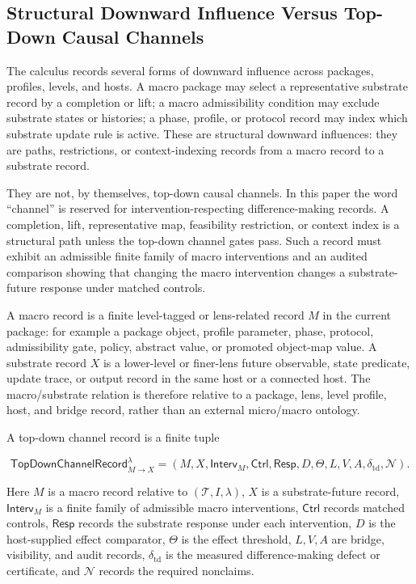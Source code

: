 \documentclass[11pt]{article}
\theoremstyle{definition}
\begin{document}
\subsection{Structural Downward Influence Versus Top-Down Causal Channels}

The calculus records several forms of downward influence across packages, profiles, levels, and hosts. A macro package may select a representative substrate record by a completion or lift; a macro admissibility condition may exclude substrate states or histories; a phase, profile, or protocol record may index which substrate update rule is active. These are structural downward influences: they are paths, restrictions, or context-indexing records from a macro record to a substrate record.

They are not, by themselves, top-down causal channels. In this paper the word ``channel'' is reserved for intervention-respecting difference-making records. A completion, lift, representative map, feasibility restriction, or context index is a structural path unless the top-down channel gates pass. Such a record must exhibit an admissible finite family of macro interventions and an audited comparison showing that changing the macro intervention changes a substrate-future response under matched controls.

A macro record is a finite level-tagged or lens-related record \(M\) in the current package: for example a package object, profile parameter, phase, protocol, admissibility gate, policy, abstract value, or promoted object-map value. A substrate record \(X\) is a lower-level or finer-lens future observable, state predicate, update trace, or output record in the same host or a connected host. The macro/substrate relation is therefore relative to a package, lens, level profile, host, and bridge record, rather than an external micro/macro ontology.

A top-down channel record is a finite tuple

\[
\mathsf{TopDownChannelRecord}_{M\to X}^{\lambda}
=
(M,X,\mathsf{Interv}_M,\mathsf{Ctrl},\mathsf{Resp},D,\Theta,L,V,A,
\delta_{\mathrm{td}},\mathcal N).
\]

Here \(M\) is a macro record relative to \((\mathcal T,I,\lambda)\), \(X\) is a substrate-future record, \(\mathsf{Interv}_M\) is a finite family of admissible macro interventions, \(\mathsf{Ctrl}\) records matched controls, \(\mathsf{Resp}\) records the substrate response under each intervention, \(D\) is the host-supplied effect comparator, \(\Theta\) is the effect threshold, \(L,V,A\) are bridge, visibility, and audit records, \(\delta_{\mathrm{td}}\) is the measured difference-making defect or certificate, and \(\mathcal N\) records the required nonclaims.
\end{document}
